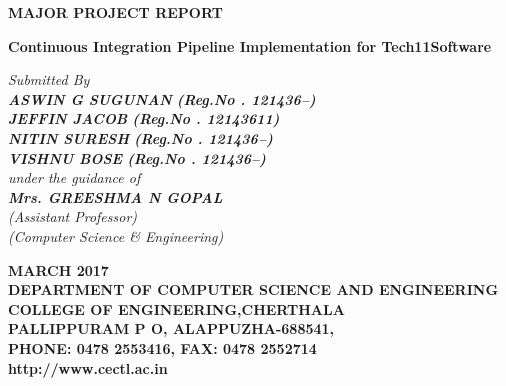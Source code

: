 \documentclass[12pt,a4paper,oneside]{report}
\begin{document}
\renewcommand\bibname{References}
\begin{titlepage}
\begin{center}
\Large{\textbf{MAJOR PROJECT REPORT}}\\
\vspace{.2 in}
\begin{singlespace}
\LARGE{\textbf{Continuous Integration Pipeline Implementation for Tech11Software }}\\
\end{singlespace}
\vspace{.2 in}
\Large{\textit{Submitted By }}\\
\Large{\textit{\textbf{ASWIN G SUGUNAN }\textbf{(Reg.No . 121436--)}}} \\
\Large{\textit{\textbf{JEFFIN JACOB  }\textbf{(Reg.No . 12143611)}}} \\
\Large{\textit{\textbf{NITIN SURESH }\textbf{(Reg.No . 121436--)}}} \\
\Large{\textit{\textbf{VISHNU BOSE }\textbf{(Reg.No . 121436--)}}} \\
\Large{\textit{\textit{under the guidance of}}}\\
\Large{\textit{\textbf{Mrs. GREESHMA N GOPAL}}}\\
\Large{\textit{(Assistant Professor)}}\\
\Large{\textit{(Computer Science \& Engineering)}}
\vspace{.05in}
\begin{figure}[h]
\begin{center}
\end{center}
\end{figure}
\begin{singlespace}
\large{\textbf{MARCH 2017}}\\
\vspace{.1in}
\large{\textbf{DEPARTMENT OF COMPUTER SCIENCE AND ENGINEERING\\COLLEGE OF ENGINEERING,CHERTHALA\\ PALLIPPURAM P O, ALAPPUZHA-688541, \\PHONE: 0478 2553416, FAX: 0478 2552714\\http://www.cectl.ac.in}}
\end{singlespace}
\end{center}
\end{titlepage}
\end{document}
